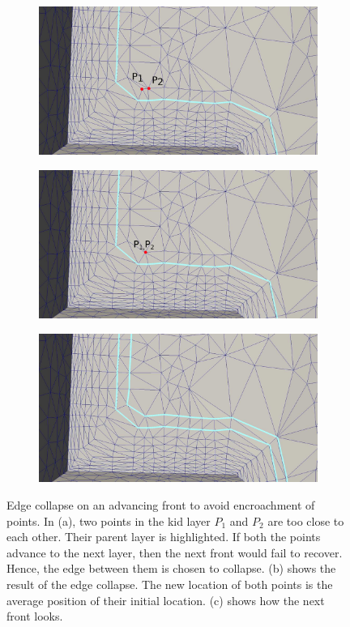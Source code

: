 \begin{figure}[hbt!]
	\centering
	\begin{subfigure}{.5\textwidth}
		\centering
		\includegraphics[width=.9\linewidth]{img/m2/edge-collapse/collapse1.eps}
		\caption{}
		\label{collapse1}
	\end{subfigure}%
	\begin{subfigure}{.5\textwidth}
		\centering
		\includegraphics[width=.9\linewidth]{img/m2/edge-collapse/collapse2.eps}
		\caption{}
		\label{collapse2}
	\end{subfigure}
	\begin{subfigure}{.5\textwidth}
		\centering
		\includegraphics[width=.9\linewidth]{img/m2/edge-collapse/collapse3.eps}
		\caption{}
		\label{collapse3}
	\end{subfigure}
	\caption[Vertex decimation on advancing front to maintain aspect ratio.]{Edge collapse on an advancing front to avoid encroachment of points. In (a), two points in the kid layer $P_1$ and $P_2$ are too close to each other. Their parent layer is highlighted. If both the points advance to the next layer, then the next front would fail to recover. Hence, the edge between them is chosen to collapse. (b) shows the result of the edge collapse. The new location of both points is the average position of their initial location. (c) shows how the next front looks.}
	\label{edge-collapse}
\end{figure}

